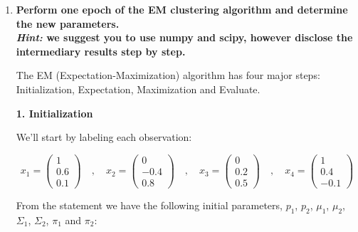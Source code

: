 \documentclass[12pt]{article}
\begin{document}
\vskip 0.2cm
\begin{enumerate}[leftmargin=\labelsep]
    \item \textbf{Perform one epoch of the EM clustering algorithm and determine the new parameters.}\\
          \textbf{\textit{Hint:} we suggest you to use numpy and scipy, however disclose the intermediary results step by step.}

          \vskip 0.3cm
          The EM (Expectation-Maximization) algorithm has four major steps:
          Initialization, Expectation, Maximization and Evaluate.

          \vskip 0.2cm
          {
          \color{stepscolor}
          \begin{large}\textbf{1. Initialization}\end{large}
          }
          \vskip 0.1cm

          We'll start by labeling each observation:

          $$
              x_1 = \begin{pmatrix} 1 \\ 0.6 \\ 0.1 \end{pmatrix}
              \quad,\quad
              x_2 = \begin{pmatrix} 0 \\ -0.4 \\ 0.8 \end{pmatrix}
              \quad,\quad
              x_3 = \begin{pmatrix} 0 \\ 0.2 \\ 0.5 \end{pmatrix}
              \quad,\quad
              x_4 = \begin{pmatrix} 1 \\ 0.4 \\ -0.1 \end{pmatrix}
          $$

          From the statement we have the following initial parameters, $p_1$, $p_2$, $\mu_1$, $\mu_2$, $\Sigma_1$,
          $\Sigma_2$, $\pi_1$ and $\pi_2$:


\end{enumerate}
\end{document}
